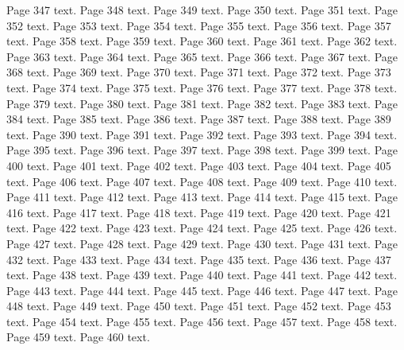 \documentclass{article}
\begin{document}
Page 347 text.\newpage
Page 348 text.\newpage
Page 349 text.\newpage
Page 350 text.\newpage
Page 351 text.\newpage
Page 352 text.\newpage
Page 353 text.\newpage
Page 354 text.\newpage
Page 355 text.\newpage
Page 356 text.\newpage
Page 357 text.\newpage
Page 358 text.\newpage
Page 359 text.\newpage
Page 360 text.\newpage
Page 361 text.\newpage
Page 362 text.\newpage
Page 363 text.\newpage
Page 364 text.\newpage
Page 365 text.\newpage
Page 366 text.\newpage
Page 367 text.\newpage
Page 368 text.\newpage
Page 369 text.\newpage
Page 370 text.\newpage
Page 371 text.\newpage
Page 372 text.\newpage
Page 373 text.\newpage
Page 374 text.\newpage
Page 375 text.\newpage
Page 376 text.\newpage
Page 377 text.\newpage
Page 378 text.\newpage
Page 379 text.\newpage
Page 380 text.\newpage
Page 381 text.\newpage
Page 382 text.\newpage
Page 383 text.\newpage
Page 384 text.\newpage
Page 385 text.\newpage
Page 386 text.\newpage
Page 387 text.\newpage
Page 388 text.\newpage
Page 389 text.\newpage
Page 390 text.\newpage
Page 391 text.\newpage
Page 392 text.\newpage
Page 393 text.\newpage
Page 394 text.\newpage
Page 395 text.\newpage
Page 396 text.\newpage
Page 397 text.\newpage
Page 398 text.\newpage
Page 399 text.\newpage
Page 400 text.\newpage
Page 401 text.\newpage
Page 402 text.\newpage
Page 403 text.\newpage
Page 404 text.\newpage
Page 405 text.\newpage
Page 406 text.\newpage
Page 407 text.\newpage
Page 408 text.\newpage
Page 409 text.\newpage
Page 410 text.\newpage
Page 411 text.\newpage
Page 412 text.\newpage
Page 413 text.\newpage
Page 414 text.\newpage
Page 415 text.\newpage
Page 416 text.\newpage
Page 417 text.\newpage
Page 418 text.\newpage
Page 419 text.\newpage
Page 420 text.\newpage
Page 421 text.\newpage
Page 422 text.\newpage
Page 423 text.\newpage
Page 424 text.\newpage
Page 425 text.\newpage
Page 426 text.\newpage
Page 427 text.\newpage
Page 428 text.\newpage
Page 429 text.\newpage
Page 430 text.\newpage
Page 431 text.\newpage
Page 432 text.\newpage
Page 433 text.\newpage
Page 434 text.\newpage
Page 435 text.\newpage
Page 436 text.\newpage
Page 437 text.\newpage
Page 438 text.\newpage
Page 439 text.\newpage
Page 440 text.\newpage
Page 441 text.\newpage
Page 442 text.\newpage
Page 443 text.\newpage
Page 444 text.\newpage
Page 445 text.\newpage
Page 446 text.\newpage
Page 447 text.\newpage
Page 448 text.\newpage
Page 449 text.\newpage
Page 450 text.\newpage
Page 451 text.\newpage
Page 452 text.\newpage
Page 453 text.\newpage
Page 454 text.\newpage
Page 455 text.\newpage
Page 456 text.\newpage
Page 457 text.\newpage
Page 458 text.\newpage
Page 459 text.\newpage
Page 460 text.\newpage
\end{document}
